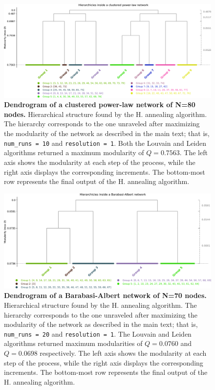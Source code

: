 \documentclass[pdflatex,sn-mathphys-num]{sn-jnl}%
\begin{document}
\begin{figure}[h]
    \centering
    \includegraphics[width=1\linewidth]{Figures/FigS3.pdf}
    \caption{\textbf{Dendrogram of a clustered power-law network \cite{Holme2002} of N=80 nodes.} Hierarchical structure found by the H. annealing algorithm. The hierarchy corresponds to the one unraveled after maximizing the modularity of the network as described in the main text; that is, {\tt num\_runs = 10} and {\tt resolution = 1}. Both the Louvain and Leiden algorithms returned a maximum modularity of $Q=0.7563$. The left axis shows the modularity at each step of the process, while the right axis displays the corresponding increments. The bottom-most row represents the final output of the H. annealing algorithm.}
    \label{fig:dendro_pw}
\end{figure}

\begin{figure}[h]
    \centering
    \includegraphics[width=1\linewidth]{Figures/FigS4.pdf}
    \caption{\textbf{Dendrogram of a Barabasi-Albert network \cite{Barabasi1999} of N=70 nodes.} Hierarchical structure found by the H. annealing algorithm. The hierarchy corresponds to the one unraveled after maximizing the modularity of the network as described in the main text; that is, {\tt num\_runs = 20} and {\tt resolution = 1}. The Louvain and Leiden algorithms returned maximum modularities of $Q=0.0760$ and $Q=0.0698$ respectively. The left axis shows the modularity at each step of the process, while the right axis displays the corresponding increments. The bottom-most row represents the final output of the H. annealing algorithm.}
    \label{fig:dendro_ba}
\end{figure}
\end{document}
